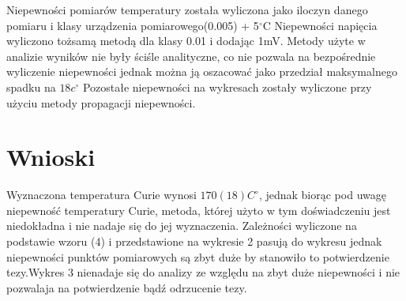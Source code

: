 \documentclass[a4paper,10pt]{article}
\begin{document}
Niepewności pomiarów temperatury została wyliczona jako iloczyn danego pomiaru i klasy urządzenia pomiarowego(0.005) + 5$^\circ$C
Niepewności napięcia wyliczono tożsamą metodą dla klasy 0.01 i dodając 1mV.
Metody użyte w analizie wyników nie były ściśle analityczne, co nie pozwala na bezpośrednie wyliczenie niepewności jednak można ją oszacować jako przedział maksymalnego spadku na $18c^\circ$
Pozostałe niepewności na wykresach zostały wyliczone przy użyciu metody propagacji niepewności.
 
\section{Wnioski}
Wyznaczona temperatura Curie wynosi $170(18)C^\circ$, jednak biorąc pod uwagę niepewność temperatury Curie, metoda, której użyto w tym doświadczeniu jest niedokładna i  nie nadaje się do jej wyznaczenia.
Zależności wyliczone na podstawie wzoru (4) i przedstawione na wykresie 2 pasują do wykresu jednak niepewności punktów pomiarowych są zbyt duże by stanowiło to potwierdzenie tezy.Wykres 3 nienadaje się do analizy ze względu na zbyt duże niepewności i nie pozwalaja na potwierdzenie bądź odrzucenie tezy. 
\end{document}
